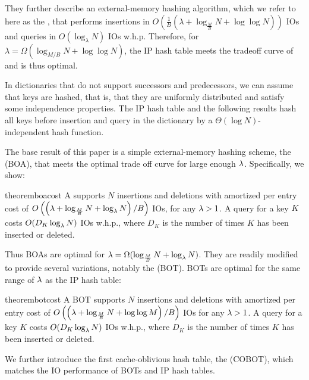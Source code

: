 They further describe an external-memory hashing algorithm, which we refer to
here as the , that performs insertions in
$O\left(\frac{1}{B}\left(\lambda + \log_{\frac{M}{B}} N + \log\log
N\right)\right)$ IOs and queries in $O(\log_\lambda N)$ IOs w.h.p. Therefore,
for $\lambda=\Omega\left(\log_{M/B}N + \log\log{N}\right)$, the IP hash table
meets the tradeoff curve of  and is thus optimal.

In dictionaries that do not support successors and predecessors, we
can assume that keys are hashed, that is, that they are uniformly
distributed and satisfy some independence properties. The IP hash
table and the following results hash all keys before
insertion and query in the dictionary by a
$\Theta(\log N)$-independent hash function.

The base result of this paper is a simple external-memory
hashing scheme, the  (BOA),
that meets the optimal  trade off curve for
large enough $\lambda$. Specifically, we show:

\begin{restatable}{theorem}{boacost}\label{thm:boa-cost}
	A \boa{} supports $N$ insertions and deletions with amortized
	per entry cost of $O\left(\left(\lambda + \log_{\frac{M}{B}} N +
	\log_\lambda{N} \right)/B\right)$ IOs, for any $\lambda > 1$. A query for a key
	$K$ costs $O(D_K\log_\lambda{N})$ IOs w.h.p., where $D_K$ is the number of times
	$K$ has been inserted or deleted.
\end{restatable}

Thus BOAs are optimal for $\lambda = \Omega(\log_{\frac{M}{B}} N +
\log_\lambda{N})$.  They are readily modified to provide several variations,
notably the  (BOT). BOTs are optimal for the
same range of $\lambda$ as the IP hash table:

\begin{restatable}{theorem}{botcost}\label{thm:bot-cost}
	A BOT supports $N$ insertions and deletions with amortized per entry cost
	of $O\left(\left(\lambda + \log_{\frac{M}{B}} N + \log\log M\right)/B\right)$
	IOs for any $\lambda > 1$.  A query for a key $K$ costs $O(D_K\log_\lambda{N})$
	IOs w.h.p., where $D_K$ is the number of times $K$ has been inserted or
	deleted.
\end{restatable}

We further introduce the first cache-oblivious hash table, the
 (COBOT), which matches the IO
performance of BOTs and IP hash tables.

